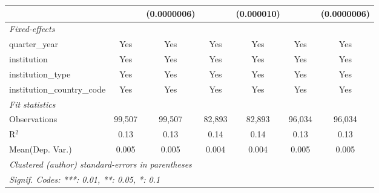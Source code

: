 \begin{tabular}{lcccccc}
                                      &               & (0.0000006)  &             & (0.000010) &               & (0.0000006)\\   
   \midrule
   \emph{Fixed-effects}\\
   quarter\_year                      & Yes           & Yes          & Yes         & Yes        & Yes           & Yes\\  
   institution                        & Yes           & Yes          & Yes         & Yes        & Yes           & Yes\\  
   institution\_type                  & Yes           & Yes          & Yes         & Yes        & Yes           & Yes\\  
   institution\_country\_code         & Yes           & Yes          & Yes         & Yes        & Yes           & Yes\\  
   \midrule
   \emph{Fit statistics}\\
   Observations                       & 99,507        & 99,507       & 82,893      & 82,893     & 96,034        & 96,034\\  
   R$^2$                              & 0.13          & 0.13         & 0.14        & 0.14       & 0.13          & 0.13\\  
Mean(Dep. Var.) & 0.005 & 0.005 & 0.004 & 0.004 & 0.005 & 0.005 \\
   \midrule \midrule
   \multicolumn{7}{l}{\emph{Clustered (author) standard-errors in parentheses}}\\
   \multicolumn{7}{l}{\emph{Signif. Codes: ***: 0.01, **: 0.05, *: 0.1}}\\
\end{tabular}
\par\endgroup

